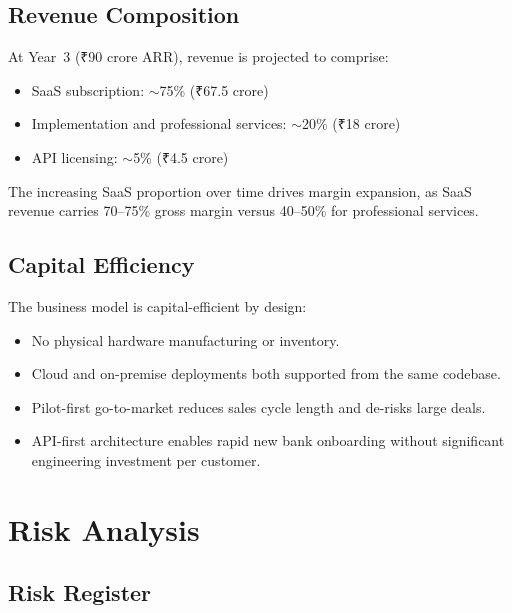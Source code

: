 \documentclass[12pt,a4paper]{article}
\newcommand{\inr}{₹}
\begin{document}
\subsection{Revenue Composition}

At Year~3 (\inr{}90 crore ARR), revenue is projected to comprise:
\begin{itemize}
  \item SaaS subscription: $\sim$75\% (\inr{}67.5 crore)
  \item Implementation and professional services: $\sim$20\% (\inr{}18 crore)
  \item API licensing: $\sim$5\% (\inr{}4.5 crore)
\end{itemize}

The increasing SaaS proportion over time drives margin expansion, as SaaS revenue carries
70--75\% gross margin versus 40--50\% for professional services.

\subsection{Capital Efficiency}

The business model is capital-efficient by design:
\begin{itemize}
  \item No physical hardware manufacturing or inventory.
  \item Cloud and on-premise deployments both supported from the same codebase.
  \item Pilot-first go-to-market reduces sales cycle length and de-risks large deals.
  \item API-first architecture enables rapid new bank onboarding without significant
        engineering investment per customer.
\end{itemize}

\newpage

\section{Risk Analysis}

\subsection{Risk Register}
\end{document}
